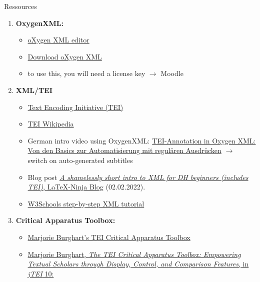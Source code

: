 \begin{frame}{Ressources}

\begin{enumerate}
    \item \textbf{OxygenXML:}
    \begin{itemize}
        \item \href{https://www.oxygenxml.com/}{oXygen XML editor}
        \item \href{https://www.oxygenxml.com/xml_editor/download_oxygenxml_editor.html}{Download oXygen XML}
        \item to use this, you will need a license key $\to$ Moodle
    \end{itemize}
    \item \textbf{XML/TEI}
    \begin{itemize}
        \item \href{https://tei-c.org/}{Text Encoding Initiative (TEI)}
        \item \href{https://de.wikipedia.org/wiki/Text_Encoding_Initiative}{TEI Wikipedia}
        \item German intro video using OxygenXML: \href{https://www.youtube.com/watch?v=fnVV9N4kkQ8}{TEI-Annotation in Oxygen XML: Von den Basics zur Automatisierung mit regulären Ausdrücken} $\to$ switch on auto-generated subtitles
        \item Blog post \href{https://latex-ninja.com/2022/02/02/a-shamelessly-short-intro-to-xml-for-dh-beginners-includes-tei/}{\emph{A shamelessly short intro to XML for DH beginners (includes TEI)}, \LaTeX{}-Ninja Blog} (02.02.2022).
        \item \href{https://www.w3schools.com/xml/}{W3Schools step-by-step XML tutorial}
    \end{itemize}
    \item \textbf{Critical Apparatus Toolbox:}
    \begin{itemize}
        \item \href{https://web.archive.org/web/20191211173459/http://teicat.huma-num.fr/}{Marjorie Burghart’s TEI Critical Apparatus Toolbox}
        \item \href{https://doi.org/10.4000/jtei.1520}{Marjorie Burghart, \emph{The TEI Critical Apparatus Toolbox: Empowering Textual Scholars through Display, Control, and Comparison Features}, in \emph{jTEI} 10: }
    \end{itemize}
    
\end{enumerate}

\end{frame}

